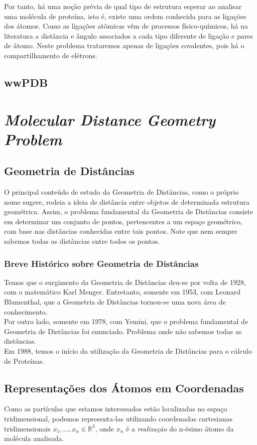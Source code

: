 \documentclass[a4paper,12pt]{article}
\begin{document}
	Por tanto, há uma noção prévia de qual tipo de estrutura esperar ao analisar uma molécula de proteína, isto é, existe uma ordem conhecida para as ligações dos átomos. Como as ligações atômicas vêm de processos físico-químicos, há na literatura a distância e ângulo associados a cada tipo diferente de ligação e pares de átomo. Neste problema trataremos apenas de ligações covalentes, pois há o compartilhamento de elétrons.
	
	\subsection{wwPDB}
	
	\newpage
	\section{\textit{Molecular Distance Geometry Problem}}
	
	\subsection{Geometria de Distâncias}
	O principal conteúdo de estudo da Geometria de Distâncias, como o próprio nome sugere, rodeia a ideia de distância entre objetos de determinada estrutura geométrica. Assim, o problema fundamental da Geometria de Distâncias consiste em determinar um conjunto de pontos, pertencentes a um espaço geométrico, com base nas distâncias conhecidas entre tais pontos. Note que nem sempre sabemos todas as distâncias entre todos os pontos.
	\subsubsection*{Breve Histórico sobre Geometria de Distâncias}
	Temos que o surgimento da Geometria de Distâncias deu-se por volta de 1928, com o matemático Karl Menger. Entretanto, somente em 1953, com Leonard Blumenthal, que a Geometria de Distâncias tornou-se uma nova área de conhecimento.
	\\
	Por outro lado, somente em 1978, com Yemini, que o problema fundamental de Geometria de Distâncias foi enunciado. Problema onde não sabemos todas as distâncias.
	\\
	Em 1988, temos o início da utilização da Geometria de Distâncias para o cálculo de Proteínas.
	
	\subsection{Representações dos Átomos em Coordenadas\label{sec:bi}}
	Como as partículas que estamos interessados estão localizadas no espaço tridimensional, podemos representa-las utilizando coordenadas cartesianas tridimensionais $x_1, ...,x_n \in\mathbb{R}^3$, onde $x_n$ é a \textit{realização} do n-ésimo átomo da molécula analisada. 
	
\end{document}
